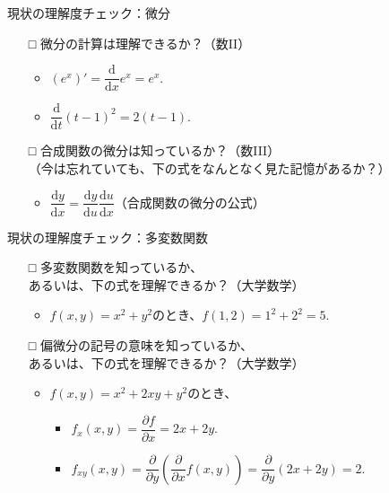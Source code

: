 \documentclass[dvipdfmx,aspectratio=169]{beamer}
\begin{document}
	\begin{frame}{現状の理解度チェック：微分}
		\begin{itemize}
			\item[□]
				微分の計算は理解できるか？（数II）
				\begin{itemize}
					\item
					$ (e^x)' = \dfrac{\mathrm{d}}{\mathrm{d}x} e^x = e^x. $\vspace{0.2em}
					\item
					$ \dfrac{\mathrm{d}}{\mathrm{d}t} (t-1)^2 = 2(t-1). $
				\end{itemize}
			\item[□]
				合成関数の微分は知っているか？（数III）\\
				（今は忘れていても、下の式をなんとなく見た記憶があるか？）
				\begin{itemize}
					\item
					$ \dfrac{\mathrm{d}y}{\mathrm{d}x} = \dfrac{\mathrm{d}y}{\mathrm{d}u} \dfrac{\mathrm{d}u}{\mathrm{d}x} $（合成関数の微分の公式）
				\end{itemize}
		\end{itemize}
	\end{frame}
	\begin{frame}{現状の理解度チェック：多変数関数}
		\begin{itemize}
			\item[□]
				多変数関数を知っているか、\\
				あるいは、下の式を理解できるか？（大学数学）
				\begin{itemize}
					\item
						$ f(x, y) = x^2 + y^2 $のとき、$ f(1, 2) = 1^2 + 2^2 = 5. $
				\end{itemize}
			\item[□]
				偏微分の記号の意味を知っているか、\\
				あるいは、下の式を理解できるか？（大学数学）
				\begin{itemize}
					\item
						$ f(x,y) = x^2 + 2xy + y^2 $のとき、
						\begin{itemize}
							\item
								$ f_x(x,y) = \dfrac{\partial f}{\partial x} = 2x + 2y. $
							\item
								$ f_{xy}(x,y) = \dfrac{\partial}{\partial y} \left(\dfrac{\partial}{\partial x} f(x,y) \right) = \dfrac{\partial}{\partial y} (2x + 2y) = 2. $
						\end{itemize}
				\end{itemize}
		\end{itemize}
	\end{frame}	
\end{document}
